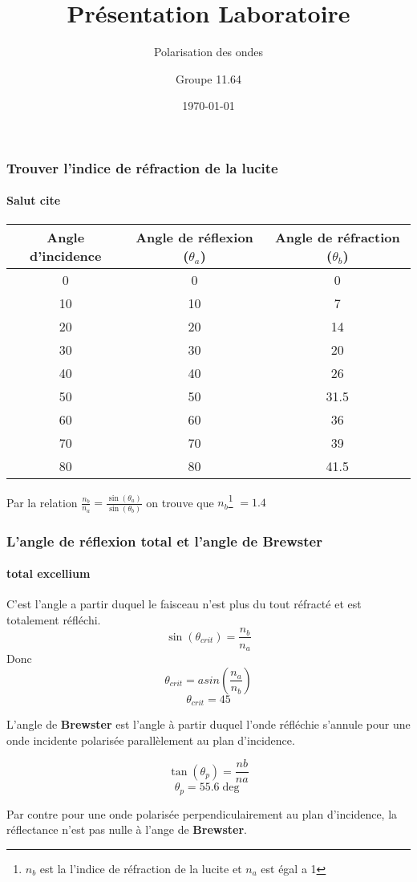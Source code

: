 \documentclass{beamer}
\begin{document}
\title[Présentation]{Présentation Laboratoire}

\subtitle[\ldots]{Polarisation des ondes}
\author{Groupe 11.64}
\date{\today}
\maketitle

\begin{frame}
\frametitle{Trouver l'indice de réfraction de la lucite}
\framesubtitle{Salut cite}

\begin{tabular}{|c|c|c|}
	\hline
		Angle d'incidence & Angle de réflexion ($\theta_a$) & Angle de réfraction ($\theta_b$) \\
	\hline
		0 & 0 & 0 \\
		10 & 10 & 7 \\
		20 & 20 & 14 \\
		30 & 30 & 20 \\
		40 & 40 & 26 \\
		50 & 50 & 31.5 \\
		60 & 60 & 36 \\
		70 & 70 & 39 \\
		80 & 80 & 41.5 \\
	\hline
	\end{tabular}
	
	Par la relation $ \frac{n_b}{n_a} = \frac{\sin (\theta_a)}{\sin (\theta_b)} $ on trouve que $n_b$\footnote{$n_b$ est la l'indice de réfraction de la lucite et $n_a$ est égal a 1} $= 1.4$ 

\end{frame} 

\begin{frame}
\frametitle{L'angle de réflexion total et l'angle de Brewster}
\framesubtitle{total excellium}
C'est l'angle a partir duquel le faisceau n'est plus du tout réfracté et est totalement réfléchi.
$$ \sin (\theta_{crit} ) = \frac{n_b}{n_a} $$
Donc $$ \theta_{crit} = asin (\frac{n_a}{n_b} ) $$
$$ \theta_{crit} = 45 $$

L'angle de \textbf{Brewster} est l'angle à partir duquel l'onde réfléchie s'annule pour une onde incidente polarisée parallèlement au plan d'incidence.

$$ \tan (\theta_p) = \frac{nb}{na} $$
$$ \theta_p = 55.6 \deg $$

Par contre pour une onde polarisée perpendiculairement au plan d'incidence, la réflectance n'est pas nulle à l'ange de \textbf{Brewster}.

\end{frame}
\end{document}
